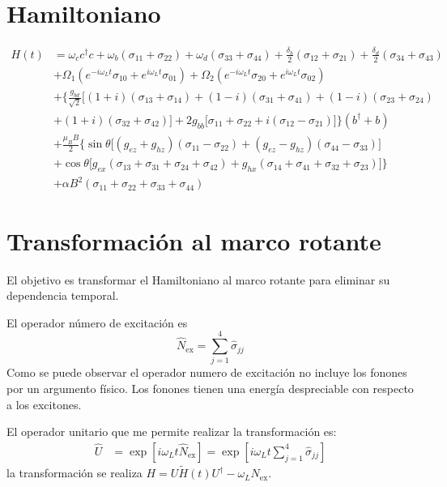 \documentclass[main.tex]{subfiles}
\begin{document}
\chapter{Hamiltoniano}
\begin{align}
	H(t) &= \omega_c c^\dagger c + \omega_b(\sigma_{11} + \sigma_{22}) + \omega_d(\sigma_{33} + \sigma_{44}) + \frac{\delta_b}{2}(\sigma_{12} + \sigma_{21}) + \frac{\delta_d}{2}(\sigma_{34} + \sigma_{43}) \nonumber \\
	&+ \Omega_1(e^{-i\omega_L t}\sigma_{10} + e^{i\omega_L t}\sigma_{01}) + \Omega_2(e^{-i\omega_L t}\sigma_{20} + e^{i\omega_L t}\sigma_{02}) \nonumber \\
	&+ \Big\{ \frac{g_{bd}}{\sqrt{2}} \big[(1+i)(\sigma_{13} + \sigma_{14}) + (1-i)(\sigma_{31} + \sigma_{41}) + (1-i)(\sigma_{23} + \sigma_{24})\nonumber \\
	&+ (1+i)(\sigma_{32} + \sigma_{42}) \big] + 2g_{bb} \big[\sigma_{11} + \sigma_{22} + i(\sigma_{12} - \sigma_{21}) \big] \Big\}(b^\dagger + b) \nonumber \\
	&+ \frac{\mu_B B}{2} \Big\{ \sin\theta \big[(g_{ez} + g_{hz})(\sigma_{11} - \sigma_{22}) + (g_{ez} - g_{hz})(\sigma_{44} - \sigma_{33}) \big] \nonumber \\
	&+ \cos\theta \big[ g_{ex}(\sigma_{13} + \sigma_{31} + \sigma_{24} + \sigma_{42}) + g_{hx}(\sigma_{14} + \sigma_{41} + \sigma_{32} + \sigma_{23}) \big] \Big\} \nonumber \\
	&+ \alpha B^2(\sigma_{11} + \sigma_{22} + \sigma_{33} + \sigma_{44})
\end{align}

\chapter{Transformación al marco rotante} \label{ap:marcoRotante}
El objetivo es transformar el Hamiltoniano al marco rotante para eliminar su dependencia temporal.

El operador número de excitación es
\begin{equation}
    \hat{N}_\text{ex}=\sum_{j=1}^4\hat{\sigma}_{jj}
\end{equation}
Como se puede observar el operador numero de excitación no incluye los fonones por un argumento físico. Los fonones tienen una energía despreciable con respecto a los excitones.

El operador unitario que me permite realizar la transformación es:
\begin{align}
    \hat{U} &= \exp[i\omega_Lt \hat{N}_\text{ex}] = \exp[i\omega_Lt \textstyle{\sum_{j=1}^4\hat{\sigma}_{jj}}]
\end{align}
la transformación se realiza $H = U \tilde{H}(t) U^\dagger - \omega_L N_\text{ex}$.
\end{document}
